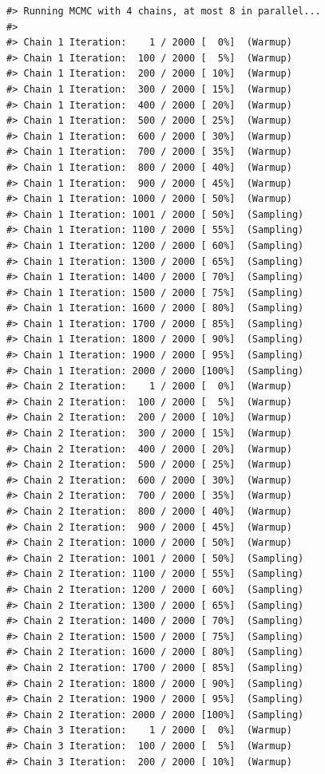 \documentclass[
  10pt,
  italian,
  a4paper,
  extrafontsizes,onecolumn,openright
  ]{memoir}
\begin{document}
\begin{verbatim}
#> Running MCMC with 4 chains, at most 8 in parallel...
#> 
#> Chain 1 Iteration:    1 / 2000 [  0%]  (Warmup) 
#> Chain 1 Iteration:  100 / 2000 [  5%]  (Warmup) 
#> Chain 1 Iteration:  200 / 2000 [ 10%]  (Warmup) 
#> Chain 1 Iteration:  300 / 2000 [ 15%]  (Warmup) 
#> Chain 1 Iteration:  400 / 2000 [ 20%]  (Warmup) 
#> Chain 1 Iteration:  500 / 2000 [ 25%]  (Warmup) 
#> Chain 1 Iteration:  600 / 2000 [ 30%]  (Warmup) 
#> Chain 1 Iteration:  700 / 2000 [ 35%]  (Warmup) 
#> Chain 1 Iteration:  800 / 2000 [ 40%]  (Warmup) 
#> Chain 1 Iteration:  900 / 2000 [ 45%]  (Warmup) 
#> Chain 1 Iteration: 1000 / 2000 [ 50%]  (Warmup) 
#> Chain 1 Iteration: 1001 / 2000 [ 50%]  (Sampling) 
#> Chain 1 Iteration: 1100 / 2000 [ 55%]  (Sampling) 
#> Chain 1 Iteration: 1200 / 2000 [ 60%]  (Sampling) 
#> Chain 1 Iteration: 1300 / 2000 [ 65%]  (Sampling) 
#> Chain 1 Iteration: 1400 / 2000 [ 70%]  (Sampling) 
#> Chain 1 Iteration: 1500 / 2000 [ 75%]  (Sampling) 
#> Chain 1 Iteration: 1600 / 2000 [ 80%]  (Sampling) 
#> Chain 1 Iteration: 1700 / 2000 [ 85%]  (Sampling) 
#> Chain 1 Iteration: 1800 / 2000 [ 90%]  (Sampling) 
#> Chain 1 Iteration: 1900 / 2000 [ 95%]  (Sampling) 
#> Chain 1 Iteration: 2000 / 2000 [100%]  (Sampling) 
#> Chain 2 Iteration:    1 / 2000 [  0%]  (Warmup) 
#> Chain 2 Iteration:  100 / 2000 [  5%]  (Warmup) 
#> Chain 2 Iteration:  200 / 2000 [ 10%]  (Warmup) 
#> Chain 2 Iteration:  300 / 2000 [ 15%]  (Warmup) 
#> Chain 2 Iteration:  400 / 2000 [ 20%]  (Warmup) 
#> Chain 2 Iteration:  500 / 2000 [ 25%]  (Warmup) 
#> Chain 2 Iteration:  600 / 2000 [ 30%]  (Warmup) 
#> Chain 2 Iteration:  700 / 2000 [ 35%]  (Warmup) 
#> Chain 2 Iteration:  800 / 2000 [ 40%]  (Warmup) 
#> Chain 2 Iteration:  900 / 2000 [ 45%]  (Warmup) 
#> Chain 2 Iteration: 1000 / 2000 [ 50%]  (Warmup) 
#> Chain 2 Iteration: 1001 / 2000 [ 50%]  (Sampling) 
#> Chain 2 Iteration: 1100 / 2000 [ 55%]  (Sampling) 
#> Chain 2 Iteration: 1200 / 2000 [ 60%]  (Sampling) 
#> Chain 2 Iteration: 1300 / 2000 [ 65%]  (Sampling) 
#> Chain 2 Iteration: 1400 / 2000 [ 70%]  (Sampling) 
#> Chain 2 Iteration: 1500 / 2000 [ 75%]  (Sampling) 
#> Chain 2 Iteration: 1600 / 2000 [ 80%]  (Sampling) 
#> Chain 2 Iteration: 1700 / 2000 [ 85%]  (Sampling) 
#> Chain 2 Iteration: 1800 / 2000 [ 90%]  (Sampling) 
#> Chain 2 Iteration: 1900 / 2000 [ 95%]  (Sampling) 
#> Chain 2 Iteration: 2000 / 2000 [100%]  (Sampling) 
#> Chain 3 Iteration:    1 / 2000 [  0%]  (Warmup) 
#> Chain 3 Iteration:  100 / 2000 [  5%]  (Warmup) 
#> Chain 3 Iteration:  200 / 2000 [ 10%]  (Warmup) 

\end{verbatim}
\end{document}
